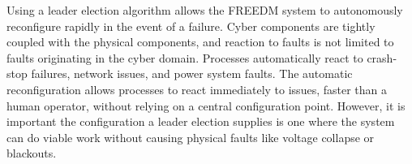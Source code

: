 Using a leader election algorithm allows the \ac{FREEDM} system to autonomously reconfigure rapidly in the event of a failure.
Cyber components are tightly coupled with the physical components, and reaction to faults is not limited to faults originating in the cyber domain.
Processes automatically react to crash-stop failures, network issues, and power system faults.
The automatic reconfiguration allows processes to react immediately to issues, faster than a human operator, without relying on a central configuration point.
However, it is important the configuration a leader election supplies is one where the system can do viable work without causing physical faults like voltage collapse or blackouts\cite{HARINI}.


%

